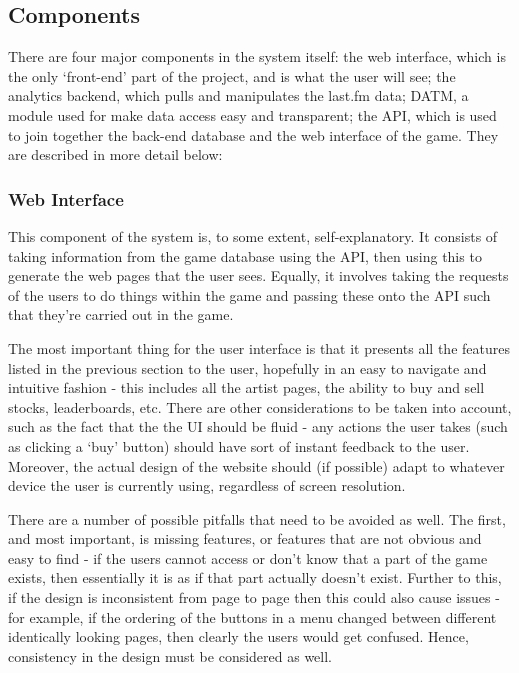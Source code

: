 \documentclass[a4paper,10pt,twoside]{article}
\begin{document}
\subsection{Components}

There are four major components in the system itself: the web interface, which is the only `front-end' part of the project, and is what the user will see; the analytics backend, which pulls and manipulates the last.fm data; DATM, a module used for make data access easy and transparent; the API, which is used to join together the back-end database and the web interface of the game. They are described in more detail below:

\subsubsection{Web Interface}

This component of the system is, to some extent, self-explanatory. It consists of taking information from the game database using the API, then using this to generate the web pages that the user sees. Equally, it involves taking the requests of the users to do things within the game and passing these onto the API such that they're carried out in the game.

The most important thing for the user interface is that it presents all the features listed in the previous section to the user, hopefully in an easy to navigate and intuitive fashion - this includes all the artist pages, the ability to buy and sell stocks, leaderboards, etc. There are other considerations to be taken into account, such as the fact that the the UI should be fluid - any actions the user takes (such as clicking a `buy' button) should have sort of instant feedback to the user. Moreover, the actual design of the website should (if possible) adapt to whatever device the user is currently using, regardless of screen resolution.

There are a number of possible pitfalls that need to be avoided as well. The first, and most important, is missing features, or features that are not obvious and easy to find - if the users cannot access or don't know that a part of the game exists, then essentially it is as if that part actually doesn't exist. Further to this, if the design is inconsistent from page to page then this could also cause issues - for example, if the ordering of the buttons in a menu changed between different identically looking pages, then clearly the users would get confused. Hence, consistency in the design must be considered as well.
\end{document}
